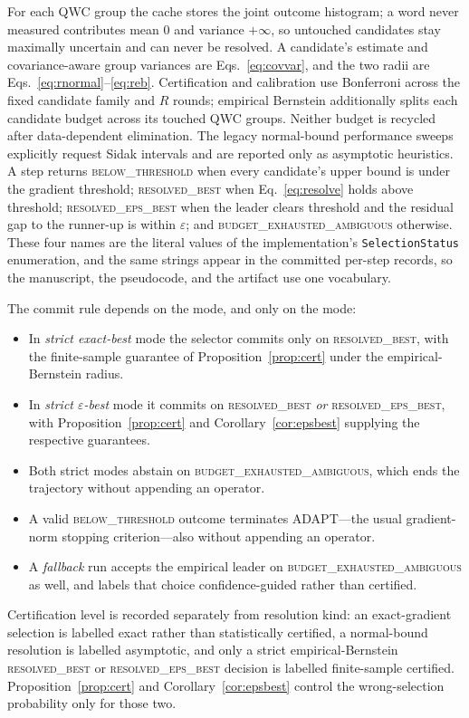\documentclass[aps,pra,reprint,superscriptaddress,nofootinbib,floatfix]{revtex4-2}
\begin{document}
For each QWC group the cache stores the joint outcome histogram; a word never measured contributes mean $0$ and variance $+\infty$, so untouched candidates stay maximally uncertain and can never be resolved. A candidate's estimate and covariance-aware group variances are Eqs.~\eqref{eq:covvar}, and the two radii are Eqs.~\eqref{eq:rnormal}--\eqref{eq:reb}. Certification and calibration use Bonferroni across the fixed candidate family and $R$ rounds; empirical Bernstein additionally splits each candidate budget across its touched QWC groups. Neither budget is recycled after data-dependent elimination. The legacy normal-bound performance sweeps explicitly request Sidak intervals and are reported only as asymptotic heuristics. A step returns \textsc{below\_threshold} when every candidate's upper bound is under the gradient threshold; \textsc{resolved\_best} when Eq.~\eqref{eq:resolve} holds above threshold; \textsc{resolved\_eps\_best} when the leader clears threshold and the residual gap to the runner-up is within $\varepsilon$; and \textsc{budget\_exhausted\_ambiguous} otherwise. These four names are the literal values of the implementation's \texttt{SelectionStatus} enumeration, and the same strings appear in the committed per-step records, so the manuscript, the pseudocode, and the artifact use one vocabulary.

The commit rule depends on the mode, and only on the mode:
\begin{itemize}
\item In \emph{strict exact-best} mode the selector commits only on \textsc{resolved\_best}, with the finite-sample guarantee of Proposition~\ref{prop:cert} under the empirical-Bernstein radius.
\item In \emph{strict $\varepsilon$-best} mode it commits on \textsc{resolved\_best} \emph{or} \textsc{resolved\_eps\_best}, with Proposition~\ref{prop:cert} and Corollary~\ref{cor:epsbest} supplying the respective guarantees.
\item Both strict modes abstain on \textsc{budget\_exhausted\_ambiguous}, which ends the trajectory without appending an operator.
\item A valid \textsc{below\_threshold} outcome terminates ADAPT---the usual gradient-norm stopping criterion---also without appending an operator.
\item A \emph{fallback} run accepts the empirical leader on \textsc{budget\_exhausted\_ambiguous} as well, and labels that choice confidence-guided rather than certified.
\end{itemize}
Certification level is recorded separately from resolution kind: an exact-gradient selection is labelled exact rather than statistically certified, a normal-bound resolution is labelled asymptotic, and only a strict empirical-Bernstein \textsc{resolved\_best} or \textsc{resolved\_eps\_best} decision is labelled finite-sample certified. Proposition~\ref{prop:cert} and Corollary~\ref{cor:epsbest} control the wrong-selection probability only for those two.
\end{document}
